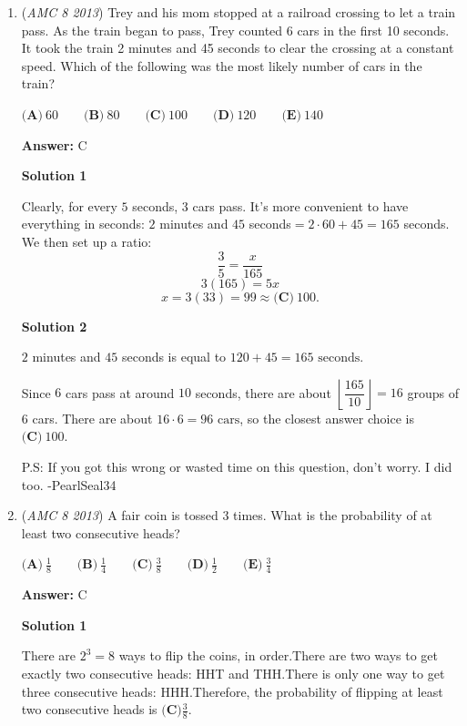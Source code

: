 \begin{enumerate}
\textbf{Solution 3(Brute Force)}

Just try all the answer choices until you get 600

 


	\item (\textit{AMC 8 2013}) Trey and his mom stopped at a railroad crossing to let a train pass. As the train began to pass, Trey counted 6 cars in the first 10 seconds. It took the train 2 minutes and 45 seconds to clear the crossing at a constant speed. Which of the following was the most likely number of cars in the train?


 $\textbf{(A)}\ 60 \qquad \textbf{(B)}\ 80 \qquad \textbf{(C)}\ 100 \qquad \textbf{(D)}\ 120 \qquad \textbf{(E)}\ 140$

 \textbf{Answer: }C



\textbf{Solution 1}

Clearly, for every $5$ seconds, $3$ cars pass. It's more convenient to have everything in seconds: $2$ minutes and $45$ seconds$=2\cdot60 + 45 = 165$ seconds. We then set up a ratio: 
 \[\frac{3}{5}=\frac{x}{165}\]
 \[3(165)=5x\]
 \[x=3(33)=99\approx\boxed{\textbf{(C)}\ 100}.\]




\textbf{Solution 2}

$2$ minutes and $45$ seconds is equal to $120+45=165\text{ seconds}$.

 Since $6$ cars pass at around $10$ seconds, there are about $\left \lfloor{\dfrac{165}{10}}\right \rfloor =16$ groups of $6$ cars. There are about $16\cdot6=96\text{ cars}$, so the closest answer choice is $\boxed{\textbf{(C)}\ 100}$.

 P.S: If you got this wrong or wasted time on this question, don't worry. I did too. -PearlSeal34

 


	\item (\textit{AMC 8 2013}) A fair coin is tossed 3 times. What is the probability of at least two consecutive heads?


 $\textbf{(A)}\ \frac18 \qquad \textbf{(B)}\ \frac14 \qquad \textbf{(C)}\ \frac38 \qquad \textbf{(D)}\ \frac12 \qquad \textbf{(E)}\ \frac34$

 \textbf{Answer: }C



\textbf{Solution 1}

There are $2^3 = 8$ ways to flip the coins, in order.There are two ways to get exactly two consecutive heads: HHT and THH.There is only one way to get three consecutive heads: HHH.Therefore, the probability of flipping at least two consecutive heads is $\boxed{\textbf{(C)}\frac{3}{8}}$.


\end{enumerate}
